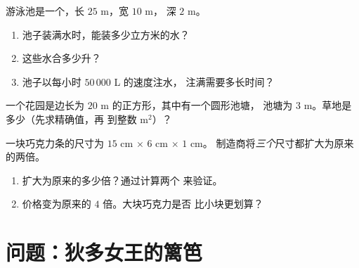\begin{exercise}[$\star\star$]\label{exo:g6:measure:10}
游泳池是一个，长 $25$ m，宽 $10$ m，
深 $2$ m。
\begin{enumerate}
  \item 池子装满水时，能装多少立方米的水？
  \item 这些水合多少升？
  \item 池子以每小时 $50\,000$ L 的速度注水，
        注满需要多长时间？
\end{enumerate}
\end{exercise}

\begin{exercise}[$\star\star$]\label{exo:g6:measure:11}
一个花园是边长为 $20$ m 的正方形，其中有一个圆形池塘，
池塘为 $3$ m。草地是多少（先求精确值，再
到整数 m$^2$）？
\end{exercise}

\begin{exercise}[$\star\star\star$]\label{exo:g6:measure:12}
一块巧克力条的尺寸为 $15$ cm $\times$ $6$ cm $\times$ $1$ cm。
制造商将\emph{三个}尺寸都扩大为原来的两倍。
\begin{enumerate}
  \item {}扩大为原来的多少倍？通过计算两个
        来验证。
  \item 价格变为原来的 $4$ 倍。大块巧克力是否
        比小块更划算？
\end{enumerate}
\end{exercise}

\section{问题：狄多女王的篱笆}

